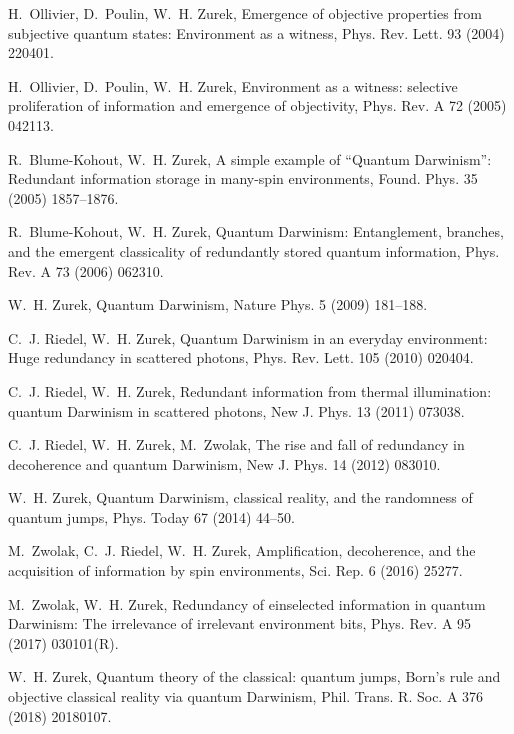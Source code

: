 \documentclass[3p,sort&compress]{elsarticle}
\begin{document}
\begin{thebibliography}{100}
H.~Ollivier, D.~Poulin, W.~H. Zurek, Emergence of objective properties from
  subjective quantum states: {E}nvironment as a witness, Phys. Rev. Lett. 93
  (2004) 220401.

H.~Ollivier, D.~Poulin, W.~H. Zurek, Environment as a witness: selective
  proliferation of information and emergence of objectivity, Phys. Rev. A 72
  (2005) 042113.

R.~Blume-Kohout, W.~H. Zurek, A simple example of ``{Q}uantum {D}arwinism'':
  {R}edundant information storage in many-spin environments, Found. Phys. 35
  (2005) 1857--1876.

R.~Blume-Kohout, W.~H. Zurek, Quantum {D}arwinism: {E}ntanglement, branches,
  and the emergent classicality of redundantly stored quantum information,
  Phys. Rev. A 73 (2006) 062310.

W.~H. Zurek, Quantum {D}arwinism, Nature Phys. 5 (2009) 181--188.

C.~J. Riedel, W.~H. Zurek, Quantum {D}arwinism in an everyday environment: Huge
  redundancy in scattered photons, Phys. Rev. Lett. 105 (2010) 020404.

C.~J. Riedel, W.~H. Zurek, Redundant information from thermal illumination:
  quantum {D}arwinism in scattered photons, New J. Phys. 13 (2011) 073038.

C.~J. Riedel, W.~H. Zurek, M.~Zwolak, The rise and fall of redundancy in
  decoherence and quantum {D}arwinism, New J. Phys. 14 (2012) 083010.

W.~H. Zurek, Quantum {D}arwinism, classical reality, and the randomness of
  quantum jumps, Phys. Today 67 (2014) 44--50.

M.~Zwolak, C.~J. Riedel, W.~H. Zurek, Amplification, decoherence, and the
  acquisition of information by spin environments, Sci. Rep. 6 (2016) 25277.

M.~Zwolak, W.~H. Zurek, Redundancy of einselected information in quantum
  {D}arwinism: {T}he irrelevance of irrelevant environment bits, Phys. Rev. A
  95 (2017) 030101(R).

W.~H. Zurek, Quantum theory of the classical: quantum jumps, {B}orn's rule and
  objective classical reality via quantum {D}arwinism, Phil. Trans. R. Soc. A
  376 (2018) 20180107.


\end{thebibliography}
\end{document}
